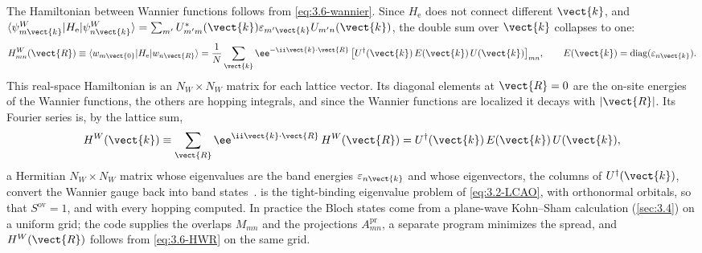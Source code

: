 The Hamiltonian between Wannier functions follows from \cref{eq:3.6-wannier}. Since $H_{\mathrm{e}}$ does not connect different $\vect{k}$, and $\langle\psi^W_{m\vect{k}}|H_{\mathrm{e}}|\psi^W_{n\vect{k}}\rangle = \sum_{m'}U^*_{m'm}(\vect{k})\varepsilon_{m'\vect{k}}U_{m'n}(\vect{k})$, the double sum over $\vect{k}$ collapses to one:
\begin{equation}
  H^W_{mn}(\vect{R}) \equiv \langle w_{m\vect{0}}|H_{\mathrm{e}}|w_{n\vect{R}}\rangle
  = \frac1N\sum_{\vect{k}}\ee^{-\ii\vect{k}\cdot\vect{R}}\,\bigl[U^\dagger(\vect{k})\,E(\vect{k})\,U(\vect{k})\bigr]_{mn},
  \qquad E(\vect{k}) = \mathrm{diag}(\varepsilon_{n\vect{k}}) .
  \label{eq:3.6-HWR}
\end{equation}
This real-space Hamiltonian is an $N_W\times N_W$ matrix for each lattice vector. Its diagonal elements at $\vect{R} = 0$ are the on-site energies of the Wannier functions, the others are hopping integrals, and since the Wannier functions are localized it decays with $|\vect{R}|$. Its Fourier series is, by the lattice sum,
\begin{equation}
  H^W(\vect{k}) \equiv \sum_{\vect{R}}\ee^{\ii\vect{k}\cdot\vect{R}}\,H^W(\vect{R}) = U^\dagger(\vect{k})\,E(\vect{k})\,U(\vect{k}) ,
  \label{eq:3.6-HWk}
\end{equation}
a Hermitian $N_W\times N_W$ matrix whose eigenvalues are the band energies $\varepsilon_{n\vect{k}}$ and whose eigenvectors, the columns of $U^\dagger(\vect{k})$, convert the Wannier gauge back into band states~\cite[Eqs.~(98) and (99)]{marzari2012maximally}.  is the tight-binding eigenvalue problem of \cref{eq:3.2-LCAO}, with orthonormal orbitals, so that $S^{\mathrm{ov}} = 1$, and with every hopping computed. In practice the Bloch states come from a plane-wave Kohn--Sham calculation (\cref{sec:3.4}) on a uniform grid; the code supplies the overlaps $M_{mn}$ and the projections $A^{\mathrm{pr}}_{mn}$, a separate program minimizes the spread, and $H^W(\vect{R})$ follows from \cref{eq:3.6-HWR} on the same grid.

